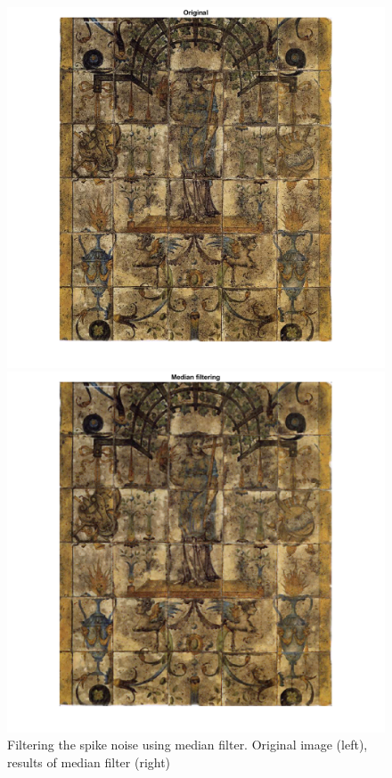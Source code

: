\documentclass[conference]{IEEEtran}
\begin{document}
\begin{figure}[ht]
\begin{multicols}{2}
    \includegraphics[width=\linewidth]{med11.png}\par 
    \includegraphics[width=\linewidth]{med12.png}\par 
    \end{multicols}
\caption{Filtering the spike noise using median filter. Original image (left), results of median filter (right)}
\label{med_1}
\end{figure}
\end{document}
